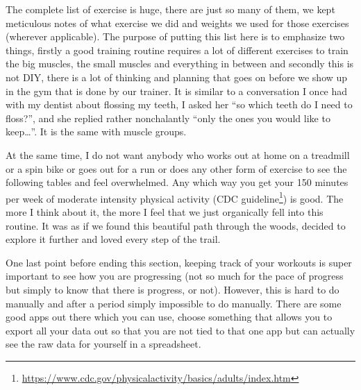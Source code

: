 \documentclass[
  oneside]{book}
\DeclareRobustCommand{\href}[2]{#2\footnote{\url{#1}}}
\begin{document}
The complete list of exercise is huge, there are just so many of them, we kept meticulous notes of what exercise we did and weights we used for those exercises (wherever applicable). The purpose of putting this list here is to emphasize two things, firstly a good training routine requires a lot of different exercises to train the big muscles, the small muscles and everything in between and secondly this is not DIY, there is a lot of thinking and planning that goes on before we show up in the gym that is done by our trainer. It is similar to a conversation I once had with my dentist about flossing my teeth, I asked her ``so which teeth do I need to floss?'', and she replied rather nonchalantly ``only the ones you would like to keep\ldots{}''. It is the same with muscle groups.

At the same time, I do not want anybody who works out at home on a treadmill or a spin bike or goes out for a run or does any other form of exercise to see the following tables and feel overwhelmed. Any which way you get your 150 minutes per week of moderate intensity physical activity (\href{https://www.cdc.gov/physicalactivity/basics/adults/index.htm}{CDC guideline}) is good. The more I think about it, the more I feel that we just organically fell into this routine. It was as if we found this beautiful path through the woods, decided to explore it further and loved every step of the trail.

One last point before ending this section, keeping track of your workouts is super important to see how you are progressing (not so much for the pace of progress but simply to know that there is progress, or not). However, this is hard to do manually and after a period simply impossible to do manually. There are some good apps out there which you can use, choose something that allows you to export all your data out so that you are not tied to that one app but can actually see the raw data for yourself in a spreadsheet.
\end{document}
